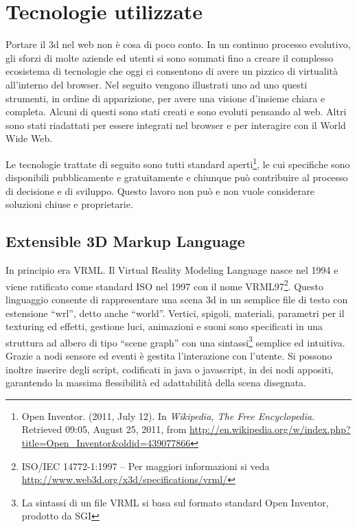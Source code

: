 \chapter{Tecnologie utilizzate}                 

Portare il 3d nel web non è cosa di poco conto. In un continuo processo evolutivo, gli sforzi di molte aziende ed utenti si sono sommati fino a creare il complesso ecosistema di tecnologie che oggi ci consentono di avere un pizzico di virtualità all'interno del browser. Nel seguito vengono illustrati uno ad uno questi strumenti, in ordine di apparizione, per avere una visione d'insieme chiara e completa. Alcuni di questi sono stati creati e sono evoluti pensando al web. Altri sono stati riadattati per essere integrati nel browser e per interagire con il World Wide Web.
 
Le tecnologie trattate di seguito sono tutti standard aperti\footnote{Open Inventor. (2011, July 12). In \textit{Wikipedia, The Free Encyclopedia}. Retrieved 09:05, August 25, 2011, from \url{http://en.wikipedia.org/w/index.php?title=Open_Inventor&oldid=439077866}}, le cui specifiche sono disponibili pubblicamente e gratuitamente e chiunque può contribuire al processo di decisione e di sviluppo. Questo lavoro non può e non vuole considerare soluzioni chiuse e proprietarie.

\clearpage
\section{Extensible 3D Markup Language}
In principio era VRML. Il Virtual Reality Modeling Language nasce nel 1994 e viene ratificato come standard ISO nel 1997 con il nome VRML97\footnote{ISO/IEC 14772-1:1997 – Per maggiori informazioni si veda \url{http://www.web3d.org/x3d/specifications/vrml/}}. Questo linguaggio consente di rappresentare una scena 3d in un semplice file di testo con estensione “wrl”, detto anche “world”. Vertici, spigoli, materiali, parametri per il texturing ed effetti, gestione luci, animazioni e suoni sono specificati in una struttura ad albero di tipo “scene graph” con una sintassi\footnote{La sintassi di un file VRML si basa sul formato standard Open Inventor, prodotto da SGI} semplice ed intuitiva. Grazie a nodi sensore ed eventi è gestita l'interazione con l'utente. Si possono inoltre inserire degli script, codificati in java o javascript, in dei nodi appositi, garantendo la massima flessibilità ed adattabilità della scena disegnata.

